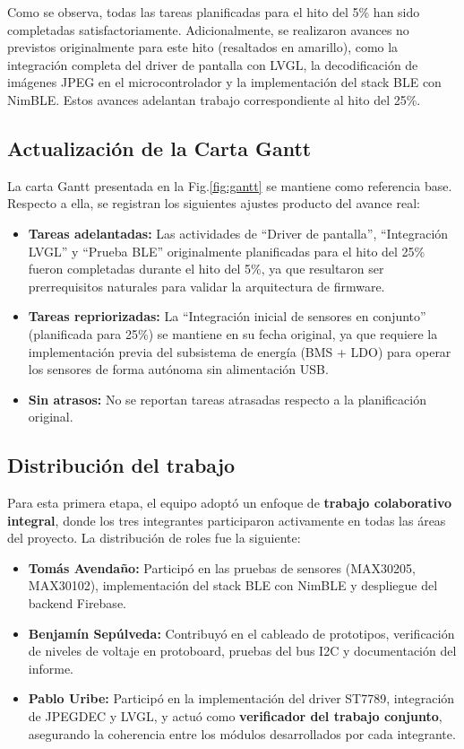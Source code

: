\documentclass[letterpaper,11pt]{article}
\newcommand{\rfigura}[1]{Fig.\ref{#1}}
\begin{document}
Como se observa, todas las tareas planificadas para el hito del 5\% han sido completadas satisfactoriamente. Adicionalmente, se realizaron avances no previstos originalmente para este hito (resaltados en amarillo), como la integración completa del driver de pantalla con LVGL, la decodificación de imágenes JPEG en el microcontrolador y la implementación del stack BLE con NimBLE. Estos avances adelantan trabajo correspondiente al hito del 25\%.

\subsection{Actualización de la Carta Gantt}

La carta Gantt presentada en la \rfigura{fig:gantt} se mantiene como referencia base. Respecto a ella, se registran los siguientes ajustes producto del avance real:

\begin{itemize}
    \item \textbf{Tareas adelantadas:} Las actividades de ``Driver de pantalla'', ``Integración LVGL'' y ``Prueba BLE'' originalmente planificadas para el hito del 25\% fueron completadas durante el hito del 5\%, ya que resultaron ser prerrequisitos naturales para validar la arquitectura de firmware.
    \item \textbf{Tareas repriorizadas:} La ``Integración inicial de sensores en conjunto'' (planificada para 25\%) se mantiene en su fecha original, ya que requiere la implementación previa del subsistema de energía (BMS + LDO) para operar los sensores de forma autónoma sin alimentación USB.
    \item \textbf{Sin atrasos:} No se reportan tareas atrasadas respecto a la planificación original.
\end{itemize}

\subsection{Distribución del trabajo}

Para esta primera etapa, el equipo adoptó un enfoque de \textbf{trabajo colaborativo integral}, donde los tres integrantes participaron activamente en todas las áreas del proyecto. La distribución de roles fue la siguiente:

\begin{itemize}
    \item \textbf{Tomás Avendaño:} Participó en las pruebas de sensores (MAX30205, MAX30102), implementación del stack BLE con NimBLE y despliegue del backend Firebase.
    \item \textbf{Benjamín Sepúlveda:} Contribuyó en el cableado de prototipos, verificación de niveles de voltaje en protoboard, pruebas del bus I2C y documentación del informe.
    \item \textbf{Pablo Uribe:} Participó en la implementación del driver ST7789, integración de JPEGDEC y LVGL, y actuó como \textbf{verificador del trabajo conjunto}, asegurando la coherencia entre los módulos desarrollados por cada integrante.
\end{itemize}
\end{document}
